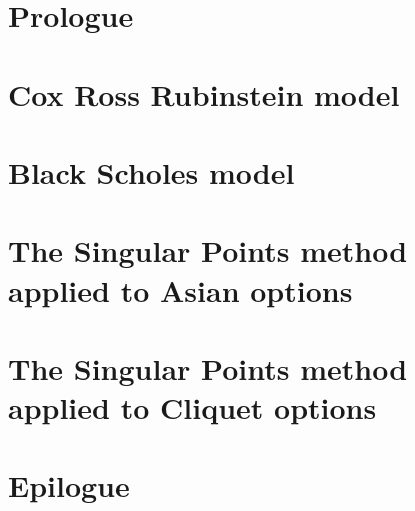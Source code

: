 \documentclass[12pt,a4paper]{amsbook}
\begin{document}
%
%



\mainmatter

\chapter{Prologue}
\label{cha:prologue}


\chapter{Cox Ross Rubinstein model}
\label{cha:crr}


\chapter{Black Scholes model}
\label{cha:bs}


\chapter[Asian options]{The Singular Points method applied to Asian options}
\label{cha:sp-asian}


\chapter[Cliquet options]{The Singular Points method applied to Cliquet options}
\label{cha:sp-cliquet}


\chapter{Epilogue}
\label{cha:epilogue}
%

\appendix


\backmatter

\printbibliography
\end{document}
